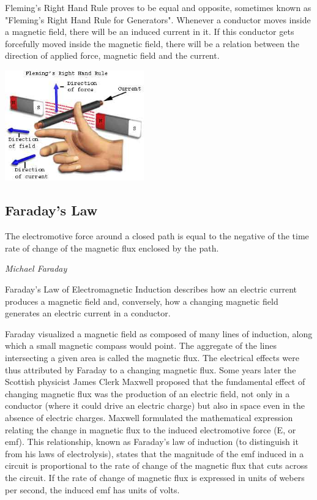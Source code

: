 \documentclass[11pt,a4paper]{article}
\begin{document}
Fleming's Right Hand Rule proves to be equal and opposite, sometimes known as "Fleming's Right Hand Rule for Generators". Whenever a conductor moves inside a magnetic field, there will be an induced current in it. If this conductor gets forcefully moved inside the magnetic field, there will be a relation between the direction of applied force, magnetic field and the current.
\begin{center}
\includegraphics[width=6cm]{fleming-right-hand-rule.jpg}
\end{center}
\subsection{Faraday's Law}
\epigraph{The electromotive force around a closed path is equal to the negative of the time rate of change of the magnetic flux enclosed by the path.}{\textit{Michael Faraday}}
Faraday’s Law of Electromagnetic Induction describes how an electric current produces a magnetic field and, conversely, how a changing magnetic field generates an electric current in a conductor.\cite{e9}\cite{e5}

Faraday visualized a magnetic field as composed of many lines of induction, along which a small magnetic compass would point. The aggregate of the lines intersecting a given area is called the magnetic flux. The electrical effects were thus attributed by Faraday to a changing magnetic flux. Some years later the Scottish physicist James Clerk Maxwell proposed that the fundamental effect of changing magnetic flux was the production of an electric field, not only in a conductor (where it could drive an electric charge) but also in space even in the absence of electric charges. Maxwell formulated the mathematical expression relating the change in magnetic flux to the induced electromotive force (E, or emf). This relationship, known as Faraday’s law of induction (to distinguish it from his laws of electrolysis), states that the magnitude of the emf induced in a circuit is proportional to the rate of change of the magnetic flux that cuts across the circuit. If the rate of change of magnetic flux is expressed in units of webers per second, the induced emf has units of volts. \cite{e5}
\end{document}
